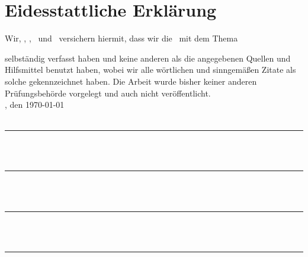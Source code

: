 \clearpage
\section*{Eidesstattliche Erklärung}
\label{sec:Eidestattliche Erklaerung}

Wir, \autorA, \autorB, \autorC \ und \autorD \ versichern hiermit, dass wir die
\art \ mit dem Thema
\begin{quote}
\textit{\untertitel}
\end{quote}
selbständig verfasst haben und keine anderen als die angegebenen Quellen und
Hilfsmittel benutzt haben, wobei wir alle wörtlichen und sinngemäßen Zitate als
solche gekennzeichnet haben. Die Arbeit wurde bisher keiner anderen
Prüfungsbehörde vorgelegt und auch nicht veröffentlicht.\\[6ex]

\ort, den \today
\\
\\
\rule[-0.2cm]{5cm}{0.5pt}

\textsc{\autorA}
\\
\\
\rule[-0.2cm]{5cm}{0.5pt}

\textsc{\autorB} 
\\
\\
\rule[-0.2cm]{5cm}{0.5pt}

\textsc{\autorC} 
\\
\\
\rule[-0.2cm]{5cm}{0.5pt}

\textsc{\autorD} 


